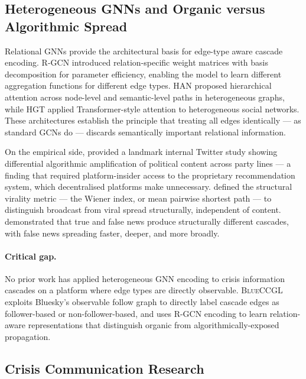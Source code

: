 \documentclass[12pt, a4paper]{article}
\newcommand{\BLUECCGL}{\textsc{BlueCCGL}\xspace}
\begin{document}
\subsection{Heterogeneous GNNs and Organic versus Algorithmic Spread}

Relational GNNs provide the architectural basis for edge-type aware cascade encoding. R-GCN \citep{schlichtkrull2018rgcn} introduced relation-specific weight matrices with basis decomposition for parameter efficiency, enabling the model to learn different aggregation functions for different edge types. HAN \citep{wang2019han} proposed hierarchical attention across node-level and semantic-level paths in heterogeneous graphs, while HGT \citep{hu2020hgt} applied Transformer-style attention to heterogeneous social networks. These architectures establish the principle that treating all edges identically --- as standard GCNs do --- discards semantically important relational information.

On the empirical side, \citet{huszar2022algorithmic} provided a landmark internal Twitter study showing differential algorithmic amplification of political content across party lines --- a finding that required platform-insider access to the proprietary recommendation system, which decentralised platforms make unnecessary. \citet{goel2016structural} defined the structural virality metric --- the Wiener index, or mean pairwise shortest path --- to distinguish broadcast from viral spread structurally, independent of content. \citet{vosoughi2018spread} demonstrated that true and false news produce structurally different cascades, with false news spreading faster, deeper, and more broadly.

\paragraph{Critical gap.} No prior work has applied heterogeneous GNN encoding to crisis information cascades on a platform where edge types are directly observable. \BLUECCGL exploits Bluesky's observable follow graph to directly label cascade edges as follower-based or non-follower-based, and uses R-GCN encoding to learn relation-aware representations that distinguish organic from algorithmically-exposed propagation.

\subsection{Crisis Communication Research}
\end{document}
